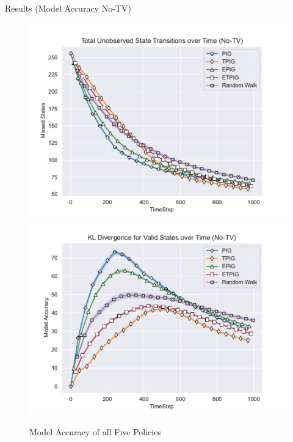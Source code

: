 	\begin{frame}[fragile]{Results (Model Accuracy No-TV)}
		\begin{figure}
			\begin{center}
				\includegraphics[scale=0.40]{"../images/Missed_States_No-TV.pdf"}
				\includegraphics[scale=0.40]{"../images/Model_Accuracy_No-TV.pdf"}
			\end{center}
			\caption{Model Accuracy of all Five Policies}
		\end{figure}
	\end{frame}
	
	
